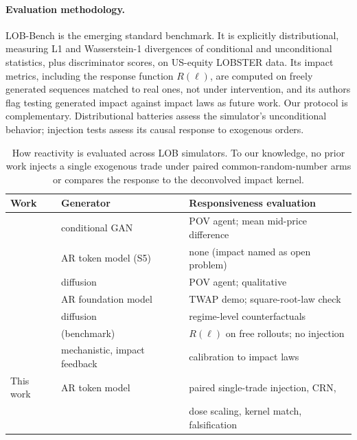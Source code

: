 \documentclass[11pt]{article}
\newcommand{\Rl}{R(\ell)}
\begin{document}
\paragraph{Evaluation methodology.} LOB-Bench \citep{lobbench2025} is the emerging standard benchmark. It is explicitly distributional, measuring L1 and Wasserstein-1 divergences of conditional and unconditional statistics, plus discriminator scores, on US-equity LOBSTER data. Its impact metrics, including the response function $\Rl$, are computed on freely generated sequences matched to real ones, not under intervention, and its authors flag testing generated impact against impact laws as future work. Our protocol is complementary. Distributional batteries assess the simulator's unconditional behavior; injection tests assess its causal response to exogenous orders.

\begin{table}[t]
\centering
\small
\begin{tabular}{lll}
\toprule
Work & Generator & Responsiveness evaluation \\
\midrule
\citet{coletta2021,coletta2022} & conditional GAN & POV agent; mean mid-price difference \\
\citet{nagy2023} & AR token model (S5) & none (impact named as open problem) \\
\citet{trades2025} & diffusion & POV agent; qualitative \\
\citet{mars2025} & AR foundation model & TWAP demo; square-root-law check \\
\citet{difflob2026} & diffusion & regime-level counterfactuals \\
\citet{lobbench2025} & (benchmark) & $\Rl$ on free rollouts; no injection \\
\citet{noble2026} & mechanistic, impact feedback & calibration to impact laws \\
\midrule
This work & AR token model & paired single-trade injection, CRN, \\
& & dose scaling, kernel match, falsification \\
\bottomrule
\end{tabular}
\caption{How reactivity is evaluated across LOB simulators. To our knowledge, no prior work injects a single exogenous trade under paired common-random-number arms or compares the response to the deconvolved impact kernel.}
\label{tab:related}
\end{table}
\end{document}
